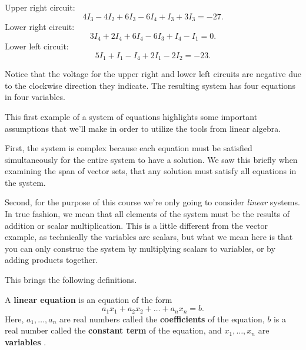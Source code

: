 \documentclass{ximera}
\begin{document}
\begin{example}
  \noindent
  Upper right circuit:
  \begin{equation*}
    4I_3 - 4I_2 + 6I_3 - 6I_4 + I_3 + 3I_3 = -27.
  \end{equation*}
  Lower right circuit:
  \begin{equation*}
    3I_4 + 2I_4 + 6I_4 - 6I_3 + I_4 - I_1 = 0.
  \end{equation*}
  Lower left circuit:
  \begin{equation*}
    5I_1+I_1-I_4+2I_1-2I_2=-23.
  \end{equation*}

  Notice that the voltage for the upper right and lower left circuits
  are negative due to the clockwise direction they indicate. The
  resulting system has four equations in four variables. 

  \begin{remark}

    This first example of a system of equations highlights some important assumptions that we'll make in order to utilize the tools from linear algebra.

    First, the system is complex because each equation must be satisfied simultaneously for the entire system to have a solution. We saw this briefly when examining the span of vector sets, that any solution must satisfy all equations in the system.

    Second, for the purpose of this course we're only going to consider \emph{linear} systems. In true fashion, we mean that all elements of the system must be the results of addition or scalar multiplication. This is a little different from the vector example, as technically the variables are scalars, but what we mean here is that you can only construc the system by multiplying scalars to variables, or by adding products together. 

    This brings the following definitions.

  \end{remark}

    \begin{definition}

      A \textbf{linear equation}%
       is an equation of the form
      \begin{equation*}
        a_1x_1 + a_2x_2 + \ldots + a_nx_n = b.
      \end{equation*}
      Here, $a_1,\ldots,a_n$ are real numbers called the
      \textbf{coefficients}%
       of the equation, $b$ is a real number called the
      \textbf{constant term}%
       of the equation, and $x_1,\ldots,x_n$ are
      \textbf{variables}%
      .
    \end{definition}


\end{example}
\end{document}
